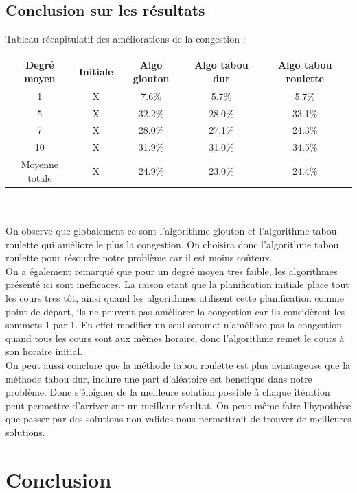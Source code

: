 \documentclass[a4paper,11pt]{article}
\begin{document}
	\subsection{Conclusion sur les résultats}
	Tableau récapitulatif des améliorations de la congestion :\\
	\begin{tabular}{|c|c|c|c|c|}
  		\hline
  		Degré moyen & Initiale & Algo glouton & Algo tabou dur & Algo tabou roulette\\
  		\hline
  		1 & X & 7.6\% & 5.7\% & 5.7\%\\
  		\hline 
  		5 & X & 32.2\% & 28.0\% & 33.1\%\\
  		\hline 
  		7 & X & 28.0\% & 27.1\% & 24.3\%\\
  		\hline 
  		10 & X & 31.9\% & 31.0\% & 34.5\%\\
  		\hline 
  		Moyenne totale & X & 24.9\% & 23.0\% & 24.4\%\\
  	\end{tabular}
	\\
	\\
	On observe que globalement ce sont l'algorithme glouton et l'algorithme tabou roulette qui améliore le plus la congestion. On choisira donc l'algorithme tabou roulette pour résoudre notre problème car il est moins coûteux.\\
	On a également remarqué que pour un degré moyen tres faible, les algorithmes présenté ici sont inefficaces. La raison etant que la planification initiale place tout les cours tres tôt, ainsi quand les algorithmes utilisent cette planification comme point de départ, ils ne peuvent pas améliorer la congestion car ils considèrent les sommets 1 par 1. En effet modifier un seul sommet n'améliore pas la congestion quand tous les cours sont aux mêmes horaire, donc l'algorithme remet le cours à son horaire initial.\\
	On peut aussi conclure que la méthode tabou roulette est plus avantageuse que la méthode tabou dur, inclure une part d'aléatoire est benefique dans notre problème. 
	Donc s'éloigner de la meilleure solution possible à chaque itération peut permettre d'arriver sur un meilleur résultat. On peut même faire l'hypothèse que passer par des solutions non valides nous permettrait de trouver de meilleures solutions.\\

\section{Conclusion}
\end{document}
